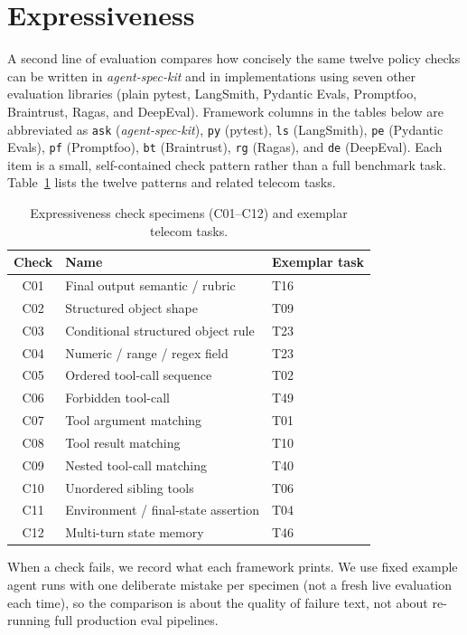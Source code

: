 \section{Expressiveness}
\label{sec:expressiveness}

A second line of evaluation compares how concisely the same twelve policy checks can be written in \emph{agent-spec-kit} and in implementations using seven other evaluation libraries (plain pytest, LangSmith, Pydantic Evals, Promptfoo, Braintrust, Ragas, and DeepEval). Framework columns in the tables below are abbreviated as \texttt{ask} (\emph{agent-spec-kit}), \texttt{py} (pytest), \texttt{ls} (LangSmith), \texttt{pe} (Pydantic Evals), \texttt{pf} (Promptfoo), \texttt{bt} (Braintrust), \texttt{rg} (Ragas), and \texttt{de} (DeepEval). Each item is a small, self-contained check pattern rather than a full benchmark task. Table~\ref{tab:check-specimens} lists the twelve patterns and related telecom tasks.

\begin{table}[htbp]
\centering
\caption{Expressiveness check specimens (C01--C12) and exemplar telecom tasks.}
\label{tab:check-specimens}
\small
\begin{tabular}{@{}clp{5.8cm}@{}}
\toprule
Check & Name & Exemplar task \\
\midrule
C01 & Final output semantic / rubric & T16 \\
C02 & Structured object shape & T09 \\
C03 & Conditional structured object rule & T23 \\
C04 & Numeric / range / regex field & T23 \\
C05 & Ordered tool-call sequence & T02 \\
C06 & Forbidden tool-call & T49 \\
C07 & Tool argument matching & T01 \\
C08 & Tool result matching & T10 \\
C09 & Nested tool-call matching & T40 \\
C10 & Unordered sibling tools & T06 \\
C11 & Environment / final-state assertion & T04 \\
C12 & Multi-turn state memory & T46 \\
\bottomrule
\end{tabular}
\end{table}

When a check fails, we record what each framework prints. We use fixed example agent runs with one deliberate mistake per specimen (not a fresh live evaluation each time), so the comparison is about the quality of failure text, not about re-running full production eval pipelines.

